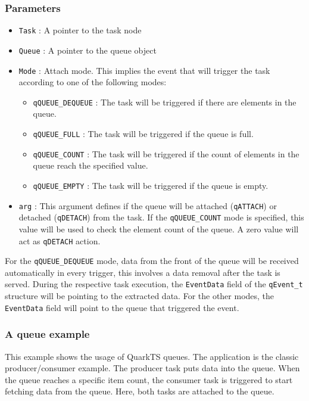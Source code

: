 \documentclass{article}
\begin{document}
\subsubsection*{Parameters}
\begin{itemize}
    \item \lstinline{Task} : A pointer to the task node
    \item \lstinline{Queue} : A pointer to the queue object
    \item \lstinline{Mode} : Attach mode. This implies the event that will trigger the task according to one of the following modes:
    \begin{itemize}
        \item \lstinline{qQUEUE_DEQUEUE} : The task will be triggered if there are elements in the queue. 
        \item \lstinline{qQUEUE_FULL} :  The task will be triggered if the queue is full. 
        \item \lstinline{qQUEUE_COUNT} :  The task will be triggered if the count of elements in the queue reach the specified value. 
        \item \lstinline{qQUEUE_EMPTY} :  The task will be triggered if the queue is empty.
    \end{itemize}
    \item \lstinline{arg} : This argument defines if the queue will be attached (\lstinline{qATTACH}) or detached (\lstinline{qDETACH}) from the task. If the \lstinline{qQUEUE_COUNT} mode is specified, this value will be used to check the element count of the queue. A zero value will act as \lstinline{qDETACH} action. 
\end{itemize}  

\begin{tcolorbox}
\HandRight For the \lstinline{qQUEUE_DEQUEUE} mode,  data from the front of the queue will be received automatically in every trigger, this involves a data removal after the task is served. During the respective task execution, the \lstinline{EventData} field of the \lstinline{qEvent_t} structure will be pointing to the extracted data. For the other modes, the \lstinline{EventData} field will point to the queue that triggered the event.
\end{tcolorbox}
    
\subsubsection{A queue example}
This example shows the usage of QuarkTS queues. The application is the classic producer/consumer example. The producer task puts data into the queue. When the queue reaches a specific item count, the consumer task is triggered to start fetching data from the queue. Here, both tasks are attached to the queue. \\
\end{document}
